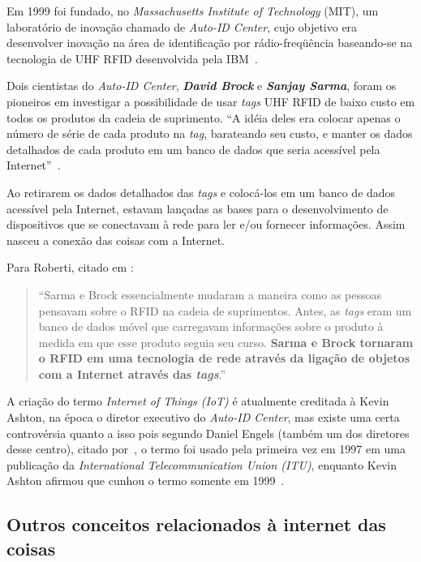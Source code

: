 \documentclass[pdftex, brazil, 12pt, twoside]{article}
\newcommand{\ingles}[1]{\textit{#1}}
\begin{document}
Em 1999 foi fundado, no \ingles{Massachusetts Institute of Technology} (MIT), um
laboratório de inovação chamado de \emph{Auto-ID Center}, cujo objetivo era
desenvolver inovação na área de identificação por rádio-freqüência baseando-se
na tecnologia de UHF RFID desenvolvida pela IBM~\citep{IEEEIoTDefinition}.

Dois cientistas do \ingles{Auto-ID Center},
\emph{\textbf{David Brock}} e \emph{\textbf{Sanjay Sarma}}, foram os pioneiros em investigar a possibilidade
de usar \ingles{tags} UHF RFID de baixo custo em todos os produtos da cadeia
de suprimento. ``A idéia deles era colocar apenas o número de série de cada produto
na \ingles{tag}, barateando seu custo, e manter os dados detalhados de cada
produto em um banco de dados que seria acessível pela Internet''~\citep[][p.\ 9]{IEEEIoTDefinition}.

Ao retirarem os dados detalhados das \ingles{tags} e colocá-los em um banco
de dados acessível pela Internet, estavam lançadas as bases para o desenvolvimento de
dispositivos que se conectavam à rede para ler e/ou fornecer informações.
Assim nasceu a conexão das coisas com a Internet.

Para Roberti, citado em \citet[][p.\ 9]{IEEEIoTDefinition}:
\begin{quote}
``Sarma e Brock
essencialmente mudaram a maneira como as pessoas pensavam sobre o RFID na
cadeia de suprimentos. Antes, as \ingles{tags} eram um banco de dados móvel
que carregavam informações sobre o produto à medida em que esse produto
seguia seu curso. \textbf{Sarma e Brock tornaram o RFID em uma tecnologia de rede
  através da ligação de objetos com a Internet através das \ingles{tags}}.''
\end{quote}

A criação do termo \ingles{Internet of Things (IoT)} é atualmente creditada à Kevin Ashton,
na época o diretor executivo do \ingles{Auto-ID Center}, mas existe uma certa
controvérsia quanto a isso pois segundo Daniel Engels (também um dos
diretores desse centro), citado por~\citet[][p.\ 10]{IEEEIoTDefinition},
o termo foi usado pela primeira vez em 1997 em uma publicação da
\ingles{International Telecommunication Union (ITU)}, enquanto Kevin Ashton afirmou
que cunhou o termo somente em 1999~\citep{AshtonIoT2009,PressIoT2014}.


\subsection{Outros conceitos relacionados à internet das coisas}
\label{o-que-e-iot-outros-tipos}
\end{document}
